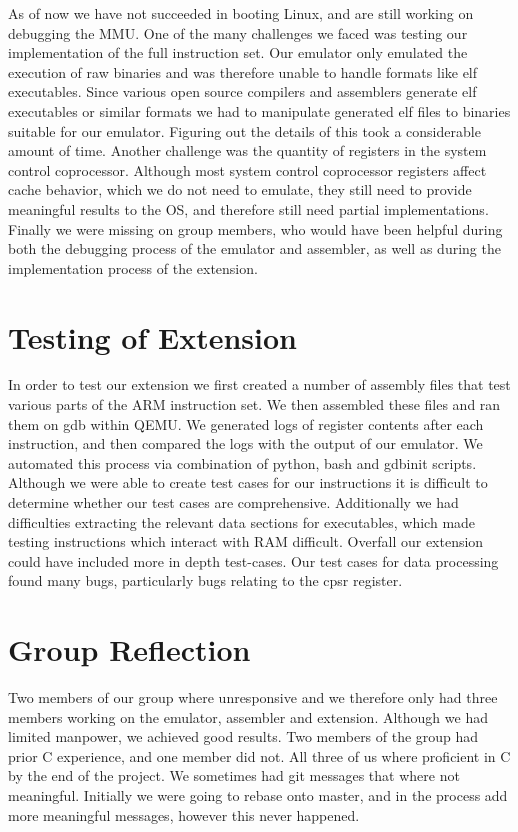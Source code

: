 \documentclass{article}
\begin{document}
As of now we have not succeeded in booting Linux, and are still working on debugging the MMU. One of the many challenges we faced was testing our implementation of the full instruction set. Our emulator only emulated the execution of raw binaries and was therefore unable to handle formats like elf executables. Since various open source compilers and assemblers generate elf executables or similar formats we had to manipulate generated elf files to binaries suitable for our emulator. Figuring out the details of this took a considerable amount of time. Another challenge was the quantity of registers in the system control coprocessor. Although most system control coprocessor registers affect cache behavior, which we do not need to emulate, they still need to provide meaningful results to the OS, and therefore still need partial implementations. Finally we were missing on group members, who would have been helpful during both the debugging process of the emulator and assembler, as well as during the implementation process of the extension. 

\section{Testing of Extension}

In order to test our extension we first created a number of assembly files that test various parts of the ARM instruction set. We then assembled these files and ran them on gdb within QEMU. We generated logs of register contents after each instruction, and then compared the logs with the output of our emulator. We automated this process via combination of python, bash and gdbinit scripts.
Although we were able to create test cases for our instructions it is difficult to determine whether our test cases are comprehensive. Additionally we had difficulties extracting the relevant data sections for executables, which made testing instructions which interact with RAM difficult. Overfall our extension could have included more in depth test-cases. Our test cases for data processing found many bugs, particularly bugs relating to the cpsr register. 


\section{Group Reflection}

Two members of our group where unresponsive and we therefore only had three members working on the emulator, assembler and extension. Although we had limited manpower, we achieved good results. Two members of the group had prior C experience, and one member did not. All three of us where proficient in C by the end of the project. We sometimes had git messages that where not meaningful. Initially we were going to rebase onto master, and in the process add more meaningful messages, however this never happened. 
\end{document}
